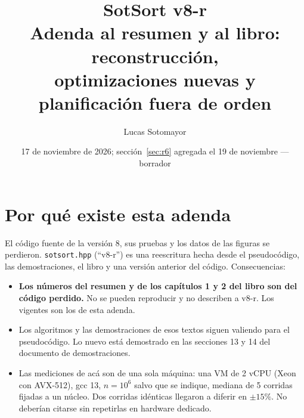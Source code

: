 \documentclass[10pt,a4paper]{article}
\title{\textbf{SotSort v8-r}\\[3pt]\large Adenda al resumen y al libro: reconstrucción,\\
optimizaciones nuevas y planificación fuera de orden}
\author{Lucas Sotomayor}
\date{17 de noviembre de 2026; sección~\ref{sec:r6} agregada el 19 de noviembre --- borrador}
\begin{document}
\maketitle

\section{Por qué existe esta adenda}
El código fuente de la versión 8, sus pruebas y los datos de las figuras se perdieron.
\texttt{sotsort.hpp} (``v8-r'') es una reescritura hecha desde el pseudocódigo, las
demostraciones, el libro y una versión anterior del código. Consecuencias:
\begin{itemize}[nosep]
\item \textbf{Los números del resumen y de los capítulos 1 y 2 del libro son del código
  perdido.} No se pueden reproducir y no describen a v8-r. Los vigentes son los de esta
  adenda.
\item Los algoritmos y las demostraciones de esos textos siguen valiendo para el
  pseudocódigo. Lo nuevo está demostrado en las secciones 13 y 14 del documento de
  demostraciones.
\item Las mediciones de acá son de una sola máquina: una VM de 2 vCPU (Xeon con
  AVX-512), gcc 13, $n=10^6$ salvo que se indique, mediana de 5 corridas fijadas a un
  núcleo. Dos corridas idénticas llegaron a diferir en $\pm15\%$. No deberían citarse
  sin repetirlas en hardware dedicado.
\end{itemize}
\end{document}

